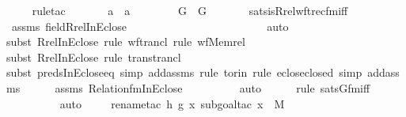 \begin{isabellebody}
\ \ \ \ \isamarkupfalse%
{\isacharparenleft}{\kern0pt}rule{\isacharunderscore}{\kern0pt}tac\ \isanewline
\ \ \ \ \ \ a\ {\isacharequal}{\kern0pt}\ a\ \ \isanewline
\ \ \ \ \ \ G\ {\isacharequal}{\kern0pt}\ G\isanewline
\ \ \ \ \ \ \ sats{\isacharunderscore}{\kern0pt}is{\isacharunderscore}{\kern0pt}Rrel{\isacharunderscore}{\kern0pt}wftrec{\isacharunderscore}{\kern0pt}fm{\isacharunderscore}{\kern0pt}iff{\isacharparenright}{\kern0pt}\isanewline
\ \ \ \ \isamarkupfalse%
\ assms\ field{\isacharunderscore}{\kern0pt}Rrel{\isacharunderscore}{\kern0pt}InEclose\ \isanewline
\ \ \ \ \ \ \ \ \ \ \ \ \ \ \ \ \ \ \ \ \ \ \isamarkupfalse%
\ auto{\isacharbrackleft}{\kern0pt}{}{}{\isacharbrackright}{\kern0pt}\isanewline
\ \ \ \ \ \ \ \ \ \ \ \ \isamarkupfalse%
{\isacharparenleft}{\kern0pt}subst\ Rrel{\isacharunderscore}{\kern0pt}InEclose{\isacharcomma}{\kern0pt}\ rule\ wf{\isacharunderscore}{\kern0pt}trancl{\isacharcomma}{\kern0pt}\ rule\ wf{\isacharunderscore}{\kern0pt}Memrel{\isacharparenright}{\kern0pt}\isanewline
\ \ \ \ \ \ \ \ \ \ \ \isamarkupfalse%
{\isacharparenleft}{\kern0pt}subst\ Rrel{\isacharunderscore}{\kern0pt}InEclose{\isacharcomma}{\kern0pt}\ rule\ trans{\isacharunderscore}{\kern0pt}trancl{\isacharparenright}{\kern0pt}\isanewline
\ \ \ \ \ \ \ \ \ \ \isamarkupfalse%
{\isacharparenleft}{\kern0pt}subst\ preds{\isacharunderscore}{\kern0pt}InEclose{\isacharunderscore}{\kern0pt}eq{\isacharcomma}{\kern0pt}\ simp\ add{\isacharcolon}{\kern0pt}assms{\isacharcomma}{\kern0pt}\ rule\ to{\isacharunderscore}{\kern0pt}rin{\isacharcomma}{\kern0pt}\ rule\ eclose{\isacharunderscore}{\kern0pt}closed{\isacharcomma}{\kern0pt}\ simp\ add{\isacharcolon}{\kern0pt}assms{\isacharparenright}{\kern0pt}\isanewline
\ \ \ \ \isamarkupfalse%
\ assms\ Relation{\isacharunderscore}{\kern0pt}fm{\isacharunderscore}{\kern0pt}InEclose\isanewline
\ \ \ \ \ \ \ \ \isamarkupfalse%
\ auto{\isacharbrackleft}{\kern0pt}{}{\isacharbrackright}{\kern0pt}\isanewline
\ \ \ \ \ \isamarkupfalse%
{\isacharparenleft}{\kern0pt}rule\ sats{\isacharunderscore}{\kern0pt}Gfm{\isacharunderscore}{\kern0pt}iff{\isacharparenright}{\kern0pt}\isanewline
\ \ \ \ \ \ \ \ \isamarkupfalse%
\ auto{\isacharbrackleft}{\kern0pt}{}{\isacharbrackright}{\kern0pt}\isanewline
\ \ \ \ \isamarkupfalse%
{\isacharparenleft}{\kern0pt}rename{\isacharunderscore}{\kern0pt}tac\ h\ g\ x{\isacharcomma}{\kern0pt}\ subgoal{\isacharunderscore}{\kern0pt}tac\ {\isachardoublequoteopen}x\ {\isasymin}\ M{\isachardoublequoteclose}{\isacharparenright}{\kern0pt}\isanewline

\end{isabellebody}
